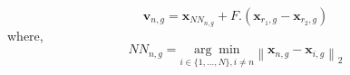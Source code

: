 \begin{equation}
\mathbf{v}_{n, g}=\mathbf{x}_{N N_{n, g}}+F.\left(\mathbf{x}_{r_{1}, g}-\mathbf{x}_{r_{2}, g}\right)
\label{fNRNAD1_equation}
\end{equation}
where,
$$N N_{n, g}=\underset{i \in\{1, \ldots, N\}, i \neq n} {\arg \min} \left\|\mathbf{x}_{n, g}-\mathbf{x}_{i, g}\right\|_{2}$$

